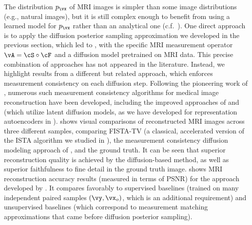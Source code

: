 \documentclass[../../book-main.tex]{subfiles}
\begin{document}
The distribution
$p_{\vx}$ of MRI images is simpler than some image distributions (e.g., natural
images), but it is still complex enough to benefit from using a learned model
for $p_{\vx}$ rather than an analytical one (c.f.\ \cite{Wright-Ma-2022}).
One direct approach is to apply the diffusion posterior sampling approximation
we developed in the previous section, which led to
, with the specific MRI
measurement operator $\vA = \cS \circ \cF$ and a diffusion model pretrained on
MRI data.
This precise combination of approaches has not appeared in the literature.
Instead, we highlight results from a different but related approach, which
enforces measurement consistency on each diffusion step.
Following the pioneering work of \textcite{song2022solving}, numerous
such measurement consistency algorithms for medical image reconstruction have been
developed, including the improved approaches of \textcite{song2024solving} and
\textcite{rout2023solving} (which utilize latent diffusion models, as we have
developed for representation autoencoders in ).
 shows visual comparisons of reconstructed
MRI images across three different samples, comparing FISTA-TV (a classical,
accelerated version of the ISTA algorithm we studied in ),
the measurement consistency diffusion modeling approach of
\textcite{song2022solving}, and the ground truth. It can be seen that superior
reconstruction quality is achieved by the diffusion-based method, as well as
superior faithfulness to fine detail in the ground truth image.
 shows MRI reconstruction accuracy results
(measured in terms of PSNR)
for the approach developed by \textcite{song2022solving}. It compares favorably
to supervised baselines (trained on many independent paired samples $(\vy,
\vx_o)$, which is an additional requirement) and unsupervised baselines (which
correspond to measurement matching approximations that came before diffusion
posterior sampling).
\end{document}
